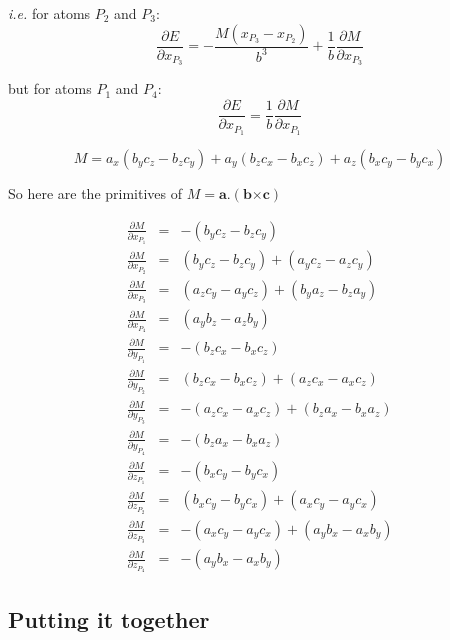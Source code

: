\documentclass[a4paper,twocolumn,9pt]{article}
\begin{document}
\emph{i.e.} for atoms $P_2$ and $P_3$:
\begin{displaymath}
  \frac{\partial E}{\partial x_{P_3}} = -\frac{M(x_{P_3}-x_{P_2})}{b^3} + \frac{1}{b}\frac{\partial M}{\partial x_{P_3}}
\end{displaymath}

but for atoms $P_1$ and $P_4$:
\begin{displaymath}
  \frac{\partial E}{\partial x_{P_1}} =  \frac{1}{b}\frac{\partial M}{\partial x_{P_1}}
\end{displaymath}

\begin{displaymath}
  M = a_x(b_y c_z - b_z c_y) + a_y (b_z c_x - b_x c_z) + a_z (b_x c_y - b_y c_x)
\end{displaymath}

So here are the primitives of $M = \mathbf{a}.(\mathbf{b} \mathbf{\times}\mathbf{c})$

\begin{eqnarray*}
  \frac{\partial M}{\partial x_{P_1}} & = & -(b_y c_z - b_z c_y)\\
  \frac{\partial M}{\partial x_{P_2}} & = & (b_y c_z - b_z c_y) + (a_y c_z - a_z c_y)\\
  \frac{\partial M}{\partial x_{P_3}} & = & (a_z c_y - a_y c_z) + (b_y a_z - b_z a_y)\\
  \frac{\partial M}{\partial x_{P_4}} & = & (a_y b_z - a_z b_y)\\
  \frac{\partial M}{\partial y_{P_1}} & = & -(b_z c_x - b_x c_z)\\
  \frac{\partial M}{\partial y_{P_2}} & = & (b_z c_x - b_x c_z) + (a_z c_x - a_x c_z)\\
  \frac{\partial M}{\partial y_{P_3}} & = & -(a_z c_x - a_x c_z) + (b_z a_x - b_x a_z)\\
  \frac{\partial M}{\partial y_{P_4}} & = & -(b_z a_x - b_x a_z)\\
  \frac{\partial M}{\partial z_{P_1}} & = & -(b_x c_y - b_y c_x)\\
  \frac{\partial M}{\partial z_{P_2}} & = & (b_x c_y - b_y c_x) + (a_x c_y - a_y c_x)\\
  \frac{\partial M}{\partial z_{P_3}} & = & -(a_x c_y - a_y c_x) + (a_y b_x - a_x b_y)\\
  \frac{\partial M}{\partial z_{P_4}} & = & -(a_y b_x - a_x b_y)
\end{eqnarray*}

\subsection{Putting it together}
\end{document}
